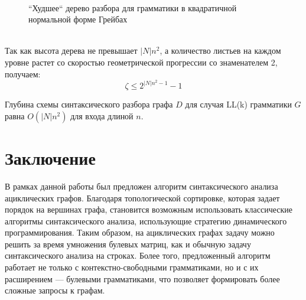 \begin{figure}
\centering
{}
 \\
	\caption{``Худшее`` дерево разбора для грамматики в квадратичной нормальной форме Грейбах}
\label{LLw}
\end{figure}
\\
Так как высота дерева не превышает $|N|n^2$, а количество листьев на каждом уровне растет со скоростью геометрической прогрессии со знаменателем 2, получаем:
\begin{equation}
\zeta \le  2^{|N|n^2 - 1} - 1
\end{equation}
\begin{corollaryrus}
Глубина схемы синтаксического разбора графа $D$ для случая LL(k) грамматики $G$ равна $O(|N|n^2)$ для входа длиной $n$.
\end{corollaryrus}


\section*{Заключение}
В рамках данной работы был предложен алгоритм синтаксического анализа ациклических графов. Благодаря топологической сортировке, которая задает порядок на вершинах графа, становится возможным использовать классические алгоритмы синтаксического анализа, использующие стратегию динамического программирования. Таким образом, на ациклических графах задачу можно решить за время умножения булевых матриц, как и обычную задачу синтаксического анализа на строках. Более того, предложенный алгоритм работает не только с контекстно-свободными грамматиками, но и с их расширением --- булевыми грамматиками, что позволяет формировать более сложные запросы к графам.


